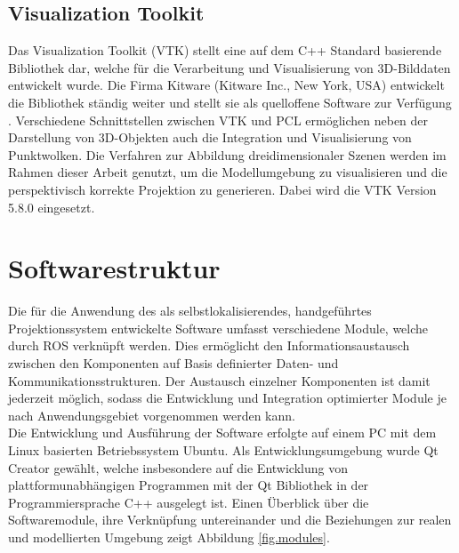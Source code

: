 \subsection{Visualization Toolkit}
\label{chap.vtk}
Das Visualization Toolkit (VTK) stellt eine auf dem C++ Standard basierende Bibliothek dar, welche für die Verarbeitung und Visualisierung von 3D-Bilddaten entwickelt wurde. Die Firma Kitware (Kitware Inc., New York, USA) entwickelt die Bibliothek ständig weiter und stellt sie als quelloffene Software zur Verfügung \cite{VTK}. Verschiedene Schnittstellen zwischen VTK und PCL ermöglichen neben der Darstellung von 3D-Objekten auch die Integration und Visualisierung von Punktwolken. Die Verfahren zur Abbildung dreidimensionaler Szenen werden im Rahmen dieser Arbeit genutzt, um die Modellumgebung zu visualisieren und die perspektivisch korrekte Projektion zu generieren. Dabei wird die VTK Version 5.8.0 eingesetzt.


\prever{
}

\prever{
}
\section{Softwarestruktur}
\label{chap.softwarestruct}
Die für die Anwendung des  als selbstlokalisierendes, handgeführtes Projektionssystem entwickelte Software umfasst verschiedene Module, welche durch ROS verknüpft werden. Dies ermöglicht den Informationsaustausch zwischen den Komponenten auf Basis definierter Daten- und Kommunikationsstrukturen. Der Austausch einzelner Komponenten ist damit jederzeit möglich, sodass die Entwicklung und Integration optimierter Module je nach Anwendungsgebiet vorgenommen werden kann.\\
Die Entwicklung und Ausführung der Software erfolgte auf einem PC mit dem Linux basierten Betriebssystem Ubuntu. Als Entwicklungsumgebung wurde Qt Creator gewählt, welche insbesondere auf die Entwicklung von plattformunabhängigen Programmen mit der Qt Bibliothek in der Programmiersprache C++ ausgelegt ist.
Einen Überblick über die Softwaremodule, ihre Verknüpfung untereinander und die Beziehungen zur realen und modellierten Umgebung zeigt Abbildung \ref{fig.modules}.\\

